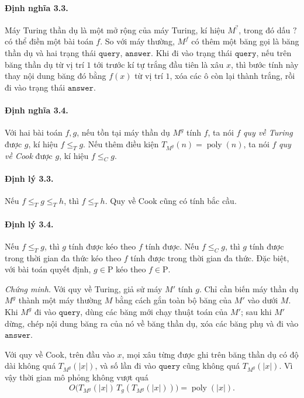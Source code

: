 \documentclass[11pt]{article}
\begin{document}
\paragraph{Định nghĩa 3.3.}
Máy Turing thần dụ là một mở rộng của máy Turing, kí hiệu \(M^?\), trong đó dấu
\(?\) có thể điền một bài toán \(f\). So với máy thường, \(M^f\) có thêm một
băng gọi là băng thần dụ và hai trạng thái \(\texttt{query}\),
\(\texttt{answer}\). Khi đi vào trạng thái \(\texttt{query}\), nếu trên băng
thần dụ từ vị trí \(1\) tới trước kí tự trắng đầu tiên là xâu \(x\), thì bước
tính này thay nội dung băng đó bằng \(f(x)\) từ vị trí \(1\), xóa các ô còn
lại thành trắng, rồi đi vào trạng thái \(\texttt{answer}\).

\paragraph{Định nghĩa 3.4.}
Với hai bài toán \(f,g\), nếu tồn tại máy thần dụ \(M^g\) tính \(f\), ta nói
\(f\) \emph{quy về Turing} được \(g\), kí hiệu \(f\le_T g\). Nếu thêm điều kiện
\(T_{M^g}(n)=\operatorname{poly}(n)\), ta nói \(f\) \emph{quy về Cook} được
\(g\), kí hiệu \(f\le_C g\).

\paragraph{Định lý 3.3.}
Nếu \(f\le_T g\le_T h\), thì \(f\le_T h\). Quy về Cook cũng có tính bắc cầu.

\paragraph{Định lý 3.4.}
Nếu \(f\le_T g\), thì \(g\) tính được kéo theo \(f\) tính được. Nếu \(f\le_C g\),
thì \(g\) tính được trong thời gian đa thức kéo theo \(f\) tính được trong thời
gian đa thức. Đặc biệt, với bài toán quyết định, \(g\in\mathrm P\) kéo theo
\(f\in\mathrm P\).

\emph{Chứng minh.}
Với quy về Turing, giả sử máy \(M'\) tính \(g\). Chỉ cần biến máy thần dụ
\(M^g\) thành một máy thường \(M\) bằng cách gắn toàn bộ băng của \(M'\) vào
dưới \(M\). Khi \(M^g\) đi vào \(\texttt{query}\), dùng các băng mới chạy thuật
toán của \(M'\); sau khi \(M'\) dừng, chép nội dung băng ra của nó về băng thần
dụ, xóa các băng phụ và đi vào \(\texttt{answer}\).

Với quy về Cook, trên đầu vào \(x\), mọi xâu từng được ghi trên băng thần dụ có
độ dài không quá \(T_{M^g}(|x|)\), và số lần đi vào \(\texttt{query}\) cũng
không quá \(T_{M^g}(|x|)\). Vì vậy thời gian mô phỏng không vượt quá
\[
  O\bigl(T_{M^g}(|x|)\,T_g(T_{M^g}(|x|))\bigr)=\operatorname{poly}(|x|).
\]
\end{document}
